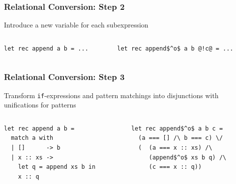 \documentclass[xcolor=table]{beamer}
\begin{document}
\begin{frame}[fragile]
  \transwipe[direction=90]
  \frametitle{Relational Conversion: Step 2}
\begin{center}  
Introduce a new variable for each subexpression
\end{center}

\begin{columns}
\begin{column}{0.5\textwidth}
\begin{lstlisting}
let rec append a b = ...
\end{lstlisting}
\end{column}
\begin{column}{0.5\textwidth}  
\begin{lstlisting}
let rec append$^o$ a b @!c@ = ...
\end{lstlisting}
\end{column}
\end{columns}  
\end{frame}

\begin{frame}[fragile]
  \transwipe[direction=90]
  \frametitle{Relational Conversion: Step 3}

\begin{center}  
Transform \lstinline{if}-expressions and pattern matchings into disjunctions with unifications for patterns
\end{center}

\begin{columns}
\begin{column}{0.5\textwidth}
\begin{lstlisting}
let rec append a b =
  match a with 
  | []      -> b
  | x :: xs -> 
    let q = append xs b in
    x :: q
\end{lstlisting}
\end{column}
\begin{column}{0.5\textwidth}  
\begin{lstlisting}
let rec append$^o$ a b c =
  (a === [] /\ b === c) \/
  (  (a === x :: xs) /\
     (append$^o$ xs b q) /\
     (c === x :: q))
\end{lstlisting}
\end{column}
\end{columns}
\end{frame}
\end{document}
